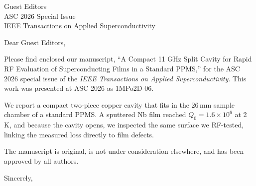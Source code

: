 \documentclass[11pt]{letter}
\date{\today}
\begin{document}
\begin{letter}{Guest Editors\\
ASC 2026 Special Issue\\
IEEE Transactions on Applied Superconductivity}

\opening{Dear Guest Editors,}

Please find enclosed our manuscript, ``A Compact 11 GHz Split Cavity for Rapid RF Evaluation of Superconducting Films in a Standard PPMS,'' for the ASC 2026 special issue of the \emph{IEEE Transactions on Applied Superconductivity}. This work was presented at ASC 2026 as 1MPo2D-06.

We report a compact two-piece copper cavity that fits in the 26\,mm sample chamber of a standard PPMS. A sputtered Nb film reached $Q_0 = 1.6\times10^{6}$ at 2\,K, and because the cavity opens, we inspected the same surface we RF-tested, linking the measured loss directly to film defects.

The manuscript is original, is not under consideration elsewhere, and has been approved by all authors.

\closing{Sincerely,}

\end{letter}
\end{document}
